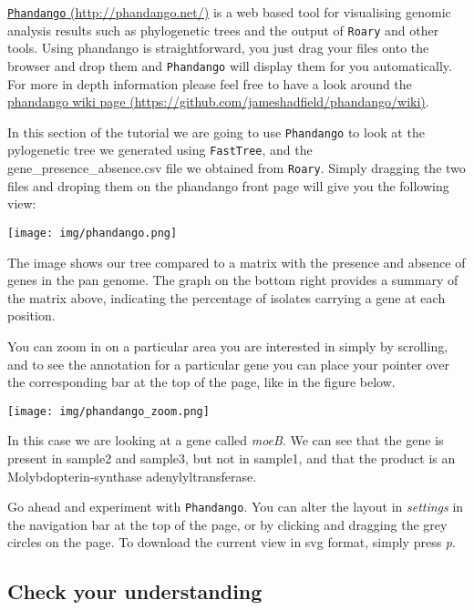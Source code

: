\documentclass[11pt]{article}
\begin{document}
\href{http://phandango.net/}{\texttt{Phandango} (http://phandango.net/)}
is a web based tool for visualising genomic analysis results such as
phylogenetic trees and the output of \texttt{Roary} and other tools.
Using phandango is straightforward, you just drag your files onto the
browser and drop them and \texttt{Phandango} will display them for you
automatically. For more in depth information please feel free to have a
look around the
\href{https://github.com/jameshadfield/phandango/wiki}{phandango wiki
page (https://github.com/jameshadfield/phandango/wiki)}.

In this section of the tutorial we are going to use \texttt{Phandango}
to look at the pylogenetic tree we generated using \texttt{FastTree},
and the gene\_presence\_absence.csv file we obtained from
\texttt{Roary}. Simply dragging the two files and droping them on the
phandango front page will give you the following view:


\begin{center}
\texttt{[image: img/phandango.png]}
\end{center}


    The image shows our tree compared to a matrix with the presence and
absence of genes in the pan genome. The graph on the bottom right
provides a summary of the matrix above, indicating the percentage of
isolates carrying a gene at each position.

You can zoom in on a particular area you are interested in simply by
scrolling, and to see the annotation for a particular gene you can place
your pointer over the corresponding bar at the top of the page, like in
the figure below.


\begin{center}
\texttt{[image: img/phandango\_zoom.png]}
\end{center}


In this case we are looking at a gene called \textit{moeB}. We can see
that the gene is present in sample2 and sample3, but not in sample1, and
that the product is an Molybdopterin-synthase adenylyltransferase.

Go ahead and experiment with \texttt{Phandango}. You can alter the
layout in \textit{settings} in the navigation bar at the top of the page,
or by clicking and dragging the grey circles on the page. To download
the current view in svg format, simply press \textit{p}.

\hypertarget{check-your-understanding}{%
\subsection{Check your understanding}\label{check-your-understanding}}
\end{document}
